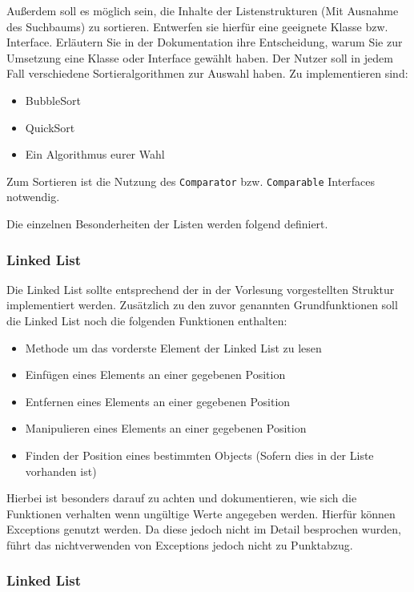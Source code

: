 \documentclass[a4paper,
			   fontsize=12pt]{article}
\begin{document}
Außerdem soll es möglich sein, die Inhalte der Listenstrukturen (Mit Ausnahme des Suchbaums) zu sortieren. Entwerfen sie hierfür eine geeignete Klasse bzw. Interface. 
Erläutern Sie in der Dokumentation ihre Entscheidung, warum Sie zur Umsetzung eine Klasse oder Interface gewählt haben. Der Nutzer soll in jedem Fall verschiedene
Sortieralgorithmen zur Auswahl haben. Zu implementieren sind:
\begin{itemize}
	\item BubbleSort
	\item QuickSort
	\item Ein Algorithmus eurer Wahl
\end{itemize}
Zum Sortieren ist die Nutzung des \texttt{Comparator} bzw. \texttt{Comparable} Interfaces notwendig.

Die einzelnen Besonderheiten der Listen werden folgend definiert.

\subsubsection*{Linked List}

Die Linked List sollte entsprechend der in der Vorlesung vorgestellten Struktur implementiert werden. Zusätzlich zu den zuvor genannten Grundfunktionen soll die Linked List noch die folgenden Funktionen enthalten:
\begin{itemize}
	\item Methode um das vorderste Element der Linked List zu lesen
	\item Einfügen eines Elements an einer gegebenen Position
	\item Entfernen eines Elements an einer gegebenen Position
	\item Manipulieren eines Elements an einer gegebenen Position
	\item Finden der Position eines bestimmten Objects (Sofern dies in der Liste vorhanden ist)
\end{itemize}

Hierbei ist besonders darauf zu achten und dokumentieren, wie sich die Funktionen verhalten wenn ungültige Werte angegeben werden. Hierfür können Exceptions genutzt werden. Da diese jedoch nicht im Detail besprochen
wurden, führt das nichtverwenden von Exceptions jedoch nicht zu Punktabzug.

\subsubsection*{Linked List}
\end{document}
